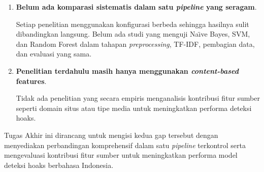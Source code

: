 \begin{enumerate}
    \item \textbf{Belum ada komparasi sistematis dalam satu \textit{pipeline} yang seragam}.  
    
	Setiap penelitian menggunakan konfigurasi berbeda sehingga hasilnya sulit dibandingkan langsung. Belum ada studi yang menguji Na\"{\i}ve Bayes, SVM, dan Random Forest dalam tahapan \textit{preprocessing}, TF-IDF, pembagian data, dan evaluasi yang sama.

    \item \textbf{Penelitian terdahulu masih hanya menggunakan \textit{content-based} features}.  
    
	Tidak ada penelitian yang secara empiris menganalisis kontribusi fitur sumber seperti domain situs atau tipe media untuk meningkatkan performa deteksi hoaks.
\end{enumerate}

Tugas Akhir ini dirancang untuk mengisi kedua gap tersebut dengan menyediakan perbandingan komprehensif dalam satu \textit{pipeline} terkontrol serta mengevaluasi kontribusi fitur sumber untuk meningkatkan performa model deteksi hoaks berbahasa Indonesia.

